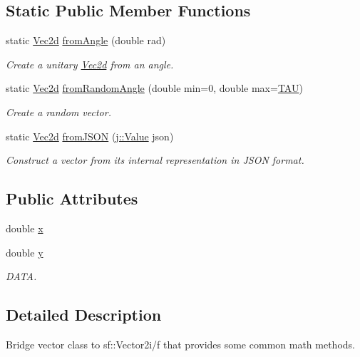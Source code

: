 \subsection*{Static Public Member Functions}
\begin{DoxyCompactItemize}
\item 
static \hyperlink{class_vec2d}{Vec2d} \hyperlink{class_vec2d_ac48859fc5a89ebe6d146e72f7efb6850}{from\-Angle} (double rad)
\begin{DoxyCompactList}\small\item\em Create a unitary \hyperlink{class_vec2d}{Vec2d} from an angle. \end{DoxyCompactList}\item 
static \hyperlink{class_vec2d}{Vec2d} \hyperlink{class_vec2d_a17169c6258d42e53c272e57777e95b3d}{from\-Random\-Angle} (double min=0, double max=\hyperlink{_constants_8hpp_a6ddce1927af7c367f02e81888bd8af46}{T\-A\-U})
\begin{DoxyCompactList}\small\item\em Create a random vector. \end{DoxyCompactList}\item 
static \hyperlink{class_vec2d}{Vec2d} \hyperlink{class_vec2d_acfe3feff6a86f801ad9548456d2473b9}{from\-J\-S\-O\-N} (\hyperlink{classj_1_1_value}{j\-::\-Value} json)
\begin{DoxyCompactList}\small\item\em Construct a vector from its internal representation in J\-S\-O\-N format. \end{DoxyCompactList}\end{DoxyCompactItemize}
\subsection*{Public Attributes}
\begin{DoxyCompactItemize}
\item 
double \hyperlink{class_vec2d_a2f2289c32bb0ae9c85facaf6b4643fa8}{x}
\item 
double \hyperlink{class_vec2d_aa314dea89fb8f30bc110f184d0a2813c}{y}
\begin{DoxyCompactList}\small\item\em D\-A\-T\-A. \end{DoxyCompactList}\end{DoxyCompactItemize}


\subsection{Detailed Description}
Bridge vector class to sf\-::\-Vector2i/f that provides some common math methods. 

